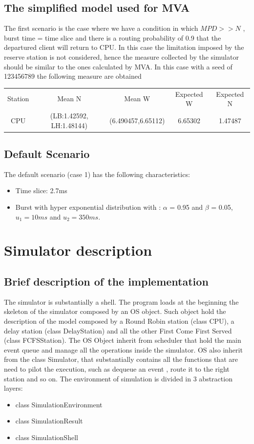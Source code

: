\documentclass[12pt,a4paper]{article}
\begin{document}
    \subsection{The simplified model used for MVA}
    The first scenario is the case where we have a condition in which $MPD>>N$ , burst time = time slice and there is a routing probability of 0.9 that the departured client will return to CPU. In this case the limitation imposed by the reserve station is not considered, hence the measure collected by the simulator should be similar to the ones calculated by MVA. In this case with a seed of 123456789 the following measure are obtained 
    \begin{center}
        \begin{tabular}{ |c|c|c|c|c}
            Station & Mean N & Mean W & Expected W & Expected N \\
            CPU & (LB:1.42592, LH:1.48144) & (6.490457,6.65112) & 6.65302 & 1.47487
            
        \end{tabular}        
    \end{center}


    \subsection{Default Scenario}
    The default scenario (case 1) has the following characteristics:
    \begin{itemize}
        \item Time slice: 2.7ms 
        \item Burst with hyper exponential distribution with : $\alpha$ = 0.95 and $\beta$ = 0.05, $u_1=10 ms$ and $u_2=350 ms$.
    \end{itemize}
    
    \section{Simulator description}
    \subsection{Brief description of the implementation}
    The simulator is substantially a shell. The program loads at the beginning the skeleton of the simulator composed by an OS object. Such object hold the description of the model composed by a Round Robin station (class CPU), a delay station (class DelayStation) and all the other First Come First Served (class FCFSStation). The OS Object inherit from scheduler that hold the main event queue and manage all the operations inside the simulator. OS also inherit from the class Simulator, that substantially contains all the functions that are need to pilot the execution, such as dequeue an event , route it to the right station and so on. The environment of simulation is divided in 3 abstraction layers: 
    \begin{itemize}
        \item class SimulationEnvironment
        \item class SimulationResult 
        \item class SimulationShell
    \end{itemize}
\end{document}
